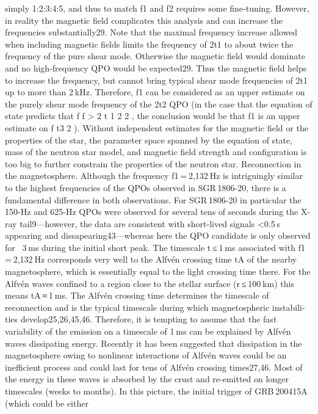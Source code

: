 simply 1:2:3:4:5, and thus to match f1 and f2 requires some fine-tuning.
However, in reality the magnetic field complicates this analysis and
can increase the frequencies substantially29. Note that the maximal
frequency increase allowed when including magnetic fields limits the
frequency of 2t1 to about twice the frequency of the pure shear mode.
Otherwise the magnetic field would dominate and no high-frequency
QPO would be expected29. Thus the magnetic field helps to increase
the frequency, but cannot bring typical shear mode frequencies of 2t1
up to more than 2 kHz. Therefore, f1 can be considered as an upper
estimate on the purely shear mode frequency of the 2t2 QPO (in the
case that the equation of state predicts that f
f
> 2
t
1
2
2 , the conclusion
would be that f1 is an upper estimate on f t3
2 ). Without independent
estimates for the magnetic field or the properties of the star, the
parameter space spanned by the equation of state, mass of the neutron
star model, and magnetic field strength and configuration is too big
to further constrain the properties of the neutron star.
Reconnection in the magnetosphere. Although the frequency
f1 = 2,132 Hz is intriguingly similar to the highest frequencies of the
QPOs observed in SGR 1806-20, there is a fundamental difference
in both observations. For SGR 1806-20 in particular the 150-Hz and
625-Hz QPOs were observed for several tens of seconds during the
X-ray tail9—however, the data are consistent with short-lived signals
<0.5 s appearing and dissapearing43—whereas here the QPO candidate
is only observed for ~3 ms during the initial short peak. The timescale
t ≤ 1 ms associated with f1 = 2,132 Hz corresponds very well to the Alfvén
crossing time tA of the nearby magnetosphere, which is essentially
equal to the light crossing time there. For the Alfvén waves confined
to a region close to the stellar surface (r ≤ 100 km) this means tA ≈ 1 ms.
The Alfvén crossing time determines the timescale of reconnection
and is the typical timescale during which magnetospheric instabili-
ties develop25,26,45,46. Therefore, it is tempting to assume that the fast
variability of the emission on a timescale of 1 ms can be explained by
Alfvén waves dissipating energy. Recently it has been suggested that
dissipation in the magnetosphere owing to nonlinear interactions of
Alfvén waves could be an inefficient process and could last for tens of
Alfvén crossing times27,46. Most of the energy in these waves is absorbed
by the crust and re-emitted on longer timescales (weeks to months).
In this picture, the initial trigger of GRB 200415A (which could be either
